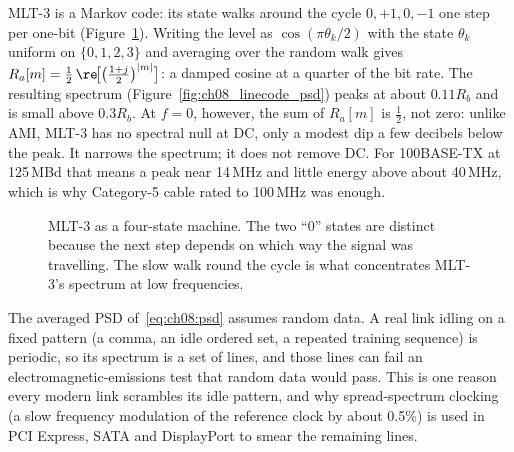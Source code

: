 MLT-3 is a Markov code: its state walks around the cycle $0,+1,0,-1$ one step per one-bit
(Figure~\ref{fig:ch08_mlt3}).
Writing the level as $\cos(\pi\theta_k/2)$ with the state $\theta_k$ uniform on $\{0,1,2,3\}$
and averaging over the random walk gives
$R_a[m]=\tfrac12\,\re\!\big[\big(\tfrac{1+j}{2}\big)^{|m|}\big]$: a damped cosine at a quarter
of the bit rate. The resulting spectrum (Figure~\ref{fig:ch08_linecode_psd}) peaks at about
$0.11R_b$ and is small above $0.3R_b$. At $f=0$, however, the sum of $R_a[m]$ is $\tfrac12$, not
zero: unlike AMI, MLT-3 has no spectral null at DC, only a modest dip a few decibels below the
peak. It narrows the spectrum; it does not remove DC. For 100BASE-TX at 125\,MBd that means a peak near
14\,MHz and little energy above about 40\,MHz, which is why Category-5 cable rated to
100\,MHz was enough.

\begin{figure}[htbp]\centering
{}
\caption{MLT-3 as a four-state machine. The two ``0'' states are distinct because the next
step depends on which way the signal was travelling. The slow walk round the cycle is what
concentrates MLT-3's spectrum at low frequencies.}
\label{fig:ch08_mlt3}
\end{figure}

\begin{pitfall}
The averaged PSD of~\eqref{eq:ch08:psd} assumes random data. A real link idling on a fixed
pattern (a comma, an idle ordered set, a repeated training sequence) is periodic, so its
spectrum is a set of lines, and those lines can fail an electromagnetic-emissions test that
random data would pass. This is one reason every modern link scrambles its idle pattern, and
why spread-spectrum clocking (a slow frequency modulation of the reference clock by about
0.5\%) is used in PCI Express, SATA and DisplayPort to smear the remaining lines.
\end{pitfall}

